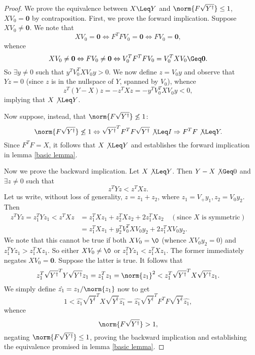 \begin{proof}
We prove the equivalence between $X \Leq Y$ and $\norm{F \sqrt{Y^{\dagger}} } \leq 1$, $X V_0 = \mathbf{0}$ by contraposition. First, we prove the forward implication. Suppose $X V_0 \neq \mathbf{0}$. We note that 
\[ XV_0 = \mathbf{0} \Leftrightarrow F^T F V_0 = \mathbf{0} \Leftrightarrow FV_0 = \mathbf{0}, \]
whence
\[ XV_0 \neq \mathbf{0} \Leftrightarrow FV_0 \neq \mathbf{0} \Leftrightarrow V_0 ^T F^T F V_0 = V_0 ^T X V_0 \Geq \mathbf{0}. \]
So $\exists y \neq 0$ such that $y^T V_0 ^T X V_0 y > 0$. We now define $z = V_0 y$ and observe that $Y z = 0$ (since $z$ is in the nullspace of $Y$, spanned by $V_0$), whence
\[ z^T (Y - X) z = - z^T X z = - y^T V_0 ^T X V_0 y  < 0, \]
implying that $X \not \Leq Y$.

\noindent Now suppose, instead, that $\norm{F \sqrt{Y^{\dagger}}} \not \leq 1$:
\[ \norm{F \sqrt{Y^{\dagger}} } \not \leq 1 \Leftrightarrow \sqrt{Y^{\dagger}} ^T F^T F \sqrt{Y^{\dagger}} \not \Leq I  \Rightarrow F^T F \not \Leq Y. \]
Since $F^T F = X$, it follows that $X \not \Leq Y$ and establishes the forward implication in lemma \ref{basic lemma}.

\noindent Now we prove the backward implication. Let $X \not \Leq Y$. Then $Y - X \not \Geq 0$ and $\exists z \neq 0$ such that
\[ z^T Y z < z^T X z. \]
Let us write, without loss of generality, $z = z_1 + z_2$, where $z_1 = V_+ y_1, z_2 = V_0 y_2$. Then 
\begin{align*}
z^T Y z = z_1 ^T Y z_1 < z^T X z &= z_1 ^T X z_1 + z_2 ^T X z_2 + 2 z_1 ^T X z_2 \quad (\text{since }X \text{ is symmetric})\\
&= z_1 ^T X z_1 + y_2 ^T V_0 ^T X V_0 y_2 + 2 z_1 ^T X V_0 y_2.
\end{align*}
We note that this cannot be true if both $XV_0 = \0$ (whence $X V_0 y_2 = 0$) and $z_1 ^T Y z_1 > z_1 ^T X z_1$. So either $XV_0 \neq \0$ or $z_1 ^T Y z_1 < z_1 ^T X z_1$. The former immediately negates $XV_0 = \mathbf{0}$. Suppose the latter is true. It follows that
\[ z_1 ^T \sqrt{Y^{\dagger}}^T Y \sqrt{Y^{\dagger}} z_1 = z_1 ^T z_1 = \norm{z_1}^2 < z_1 ^T \sqrt{Y^{\dagger}}^T X \sqrt{Y^{\dagger}} z_1. \]
We simply define $\hat{z_1} = z_1 / \norm{z_1}$ now to get 
\[ 1 < \hat{z_1} \sqrt{Y^{\dagger}}^T X \sqrt{Y^{\dagger}} \hat{z_1} = \hat{z_1} \sqrt{Y^{\dagger}}^T F^T F \sqrt{Y^{\dagger}} \hat{z_1}, \]
whence
\[ \norm{F \sqrt{Y^{\dagger}}} > 1,\]
negating $\norm{F \sqrt{Y^{\dagger}}} \leq 1$, proving the backward implication and establishing the equivalence promised in lemma \ref{basic lemma}.
\end{proof}

